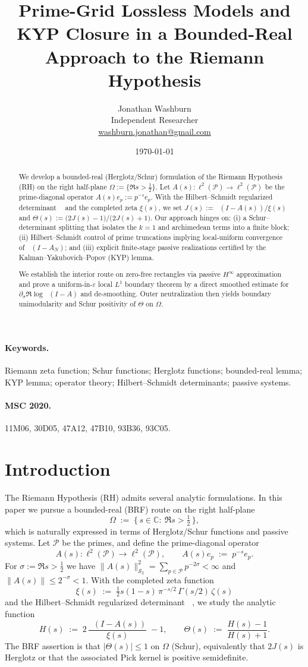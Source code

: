 \documentclass[11pt]{article}
\title{Prime-Grid Lossless Models and KYP Closure in a Bounded-Real Approach to the Riemann Hypothesis}
\author{Jonathan Washburn\\ Independent Researcher\\ \href{mailto:washburn.jonathan@gmail.com}{washburn.jonathan@gmail.com}}
\date{\today}
\theoremstyle{remark}
\newcommand{\C}{\mathbb{C}}
\newcommand{\PP}{\mathcal{P}}
\newcommand{\HS}{\mathcal{S}_2}
\newcommand{\Half}{\{\,s\in\C:\ \Re s>\tfrac12\,\}}
\DeclareMathOperator{\dettwo}{det_2}
\begin{document}
\maketitle

\begin{abstract}
We develop a bounded-real (Herglotz/Schur) formulation of the Riemann Hypothesis (RH) on the right half-plane \(\Omega:=\{\Re s>\tfrac12\}\). Let \(A(s):\ell^2(\PP)\to\ell^2(\PP)\) be the prime-diagonal operator \(A(s)e_p:=p^{-s}e_p\). With the Hilbert--Schmidt regularized determinant \(\dettwo\) and the completed zeta \(\xi(s)\), we set \(J(s):=\dettwo(I-A(s))/\xi(s)\) and \(\Theta(s):=\big(2J(s)-1\big)/\big(2J(s)+1\big)\). Our approach hinges on: (i) a Schur--determinant splitting that isolates the \(k=1\) and archimedean terms into a finite block; (ii) Hilbert--Schmidt control of prime truncations implying local-uniform convergence of \(\dettwo(I-A_N)\); and (iii) explicit finite-stage passive realizations certified by the Kalman--Yakubovich--Popov (KYP) lemma.

We establish the interior route on zero-free rectangles via passive \(H^\infty\) approximation and prove a uniform-in-\(\varepsilon\) local \(L^1\) boundary theorem by a direct smoothed estimate for \(\partial_\sigma\Re\log\dettwo(I-A)\) and de-smoothing. Outer neutralization then yields boundary unimodularity and Schur positivity of \(\Theta\) on \(\Omega\).\end{abstract}

\paragraph{Keywords.} Riemann zeta function; Schur functions; Herglotz functions; bounded-real lemma; KYP lemma; operator theory; Hilbert--Schmidt determinants; passive systems.

\paragraph{MSC 2020.} 11M06, 30D05, 47A12, 47B10, 93B36, 93C05.

\section{Introduction}
The Riemann Hypothesis (RH) admits several analytic formulations. In this paper we pursue a bounded-real (BRF) route on the right half-plane
\[
 \Omega\;:=\;\Half,
\]
which is naturally expressed in terms of Herglotz/Schur functions and passive systems. Let \(\PP\) be the primes, and define the prime-diagonal operator
\[
 A(s):\ell^2(\PP)\to\ell^2(\PP),\qquad A(s)e_p\;:=\;p^{-s}e_p.
\]
For \(\sigma:=\Re s>\tfrac12\) we have \(\|A(s)\|_{\HS}^2=\sum_{p\in\PP}p^{-2\sigma}<\infty\) and \(\|A(s)\|\le 2^{-\sigma}<1\). With the completed zeta function
\[
 \xi(s)\;:=\;\tfrac12 s(1-s)\,\pi^{-s/2}\,\Gamma(s/2)\,\zeta(s)
\]
and the Hilbert--Schmidt regularized determinant \(\dettwo\), we study the analytic function
\[
 H(s)\;:=\;2\,\frac{\dettwo(I-A(s))}{\xi(s)}\;-
 1,\qquad \Theta(s)\;:=\;\frac{H(s)-1}{H(s)+1}.
\]
The BRF assertion is that \(|\Theta(s)|\le 1\) on \(\Omega\) (Schur), equivalently that \(2J(s)\) is Herglotz or that the associated Pick kernel is positive semidefinite.
\end{document}
